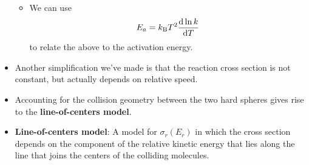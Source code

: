 \documentclass[../notes.tex]{subfiles}
\begin{document}
\begin{itemize}
\begin{itemize}
\begin{align*}
        \end{align*}
        \item We can use
        \begin{equation*}
            E_a = k_\text{B} T^2\dv{\ln k}{T}
        \end{equation*}
        to relate the above to the activation energy.
    \end{itemize}
    \item Another simplification we've made is that the reaction cross section is not constant, but actually depends on relative speed.
    \item Accounting for the collision geometry between the two hard spheres gives rise to the \textbf{line-of-centers model}.
    \item \textbf{Line-of-centers model}: A model for $\sigma_r(E_r)$ in which the cross section depends on the component of the relative kinetic energy that lies along the line that joins the centers of the colliding molecules.
    \begin{figure}[h!]
        \centering
\end{figure}
\end{itemize}
\end{document}
